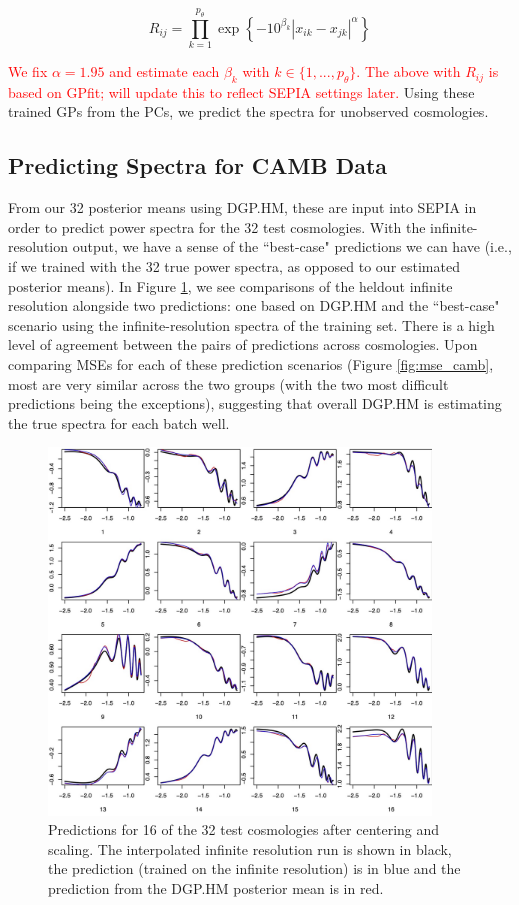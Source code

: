 \documentclass[11pt]{article}
\begin{document}
\begin{equation*}
    R_{ij} = \prod_{k=1}^{p_\theta}\exp\left\{-10^{\beta_k}|x_{ik}-x_{jk}|^\alpha\right\}
\end{equation*}

\textcolor{red}{We fix $\alpha=1.95$ and estimate each $\beta_k$ with $k \in \{1,...,p_\theta\}$. 
The above with $R_{ij}$ is based on GPfit; will update this to reflect SEPIA settings later.}
Using these trained GPs from the PCs, we predict the spectra for unobserved cosmologies.

\subsection{Predicting Spectra for CAMB Data}
\label{subsec:camb_pred}

From our 32 posterior means using DGP.HM, these are input into SEPIA in order to predict power spectra
for the 32 test cosmologies. With the infinite-resolution output, we have a sense of the ``best-case" 
predictions we can have (i.e., if we trained with the 32 true power spectra, as opposed to our 
estimated posterior means). In Figure \ref{fig:pca_preds_v_camb}, we see comparisons of the heldout 
infinite resolution alongside two predictions: one based on DGP.HM and the ``best-case" scenario using the
infinite-resolution spectra of the training set. There is a high level of agreement between the pairs
of predictions across cosmologies. Upon comparing MSEs for each of these prediction scenarios 
(Figure \ref{fig:mse_camb}, most are very similar across the two groups (with the two most difficult 
predictions being the exceptions), suggesting that overall DGP.HM is estimating the true spectra 
for each batch well.

\begin{figure}
    \centering
    \includegraphics[width=4in]{preds_diff1_4_8.jpg}
    \caption{Predictions for 16 of the 32 test cosmologies after centering and scaling. 
             The interpolated infinite resolution run is shown in black, the prediction 
             (trained on the infinite resolution) is in blue and the prediction from 
             the DGP.HM posterior mean is in red.}   
    \label{fig:pca_preds_v_camb}
\end{figure}
\end{document}
